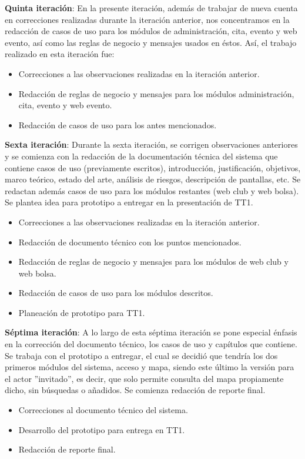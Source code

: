 \noindent
\textbf{Quinta iteración}: En la presente iteración, además de trabajar de nueva cuenta en correcciones realizadas durante la iteración anterior, nos concentramos en la redacción de casos de uso para los módulos de administración, cita, evento y web evento, así como las reglas de negocio y mensajes usados en éstos. Así, el trabajo realizado en esta iteración fue:
\begin{itemize}
	\item Correcciones a las observaciones realizadas en la iteración anterior. 
	\item Redacción de reglas de negocio y mensajes para los módulos administración, cita, evento y web evento.
	\item Redacción de casos de uso para los antes mencionados.
\end{itemize}

\noindent
\textbf{Sexta iteración}: Durante la sexta iteración, se corrigen observaciones anteriores y se comienza con la redacción de la documentación técnica del sistema que contiene casos de uso (previamente escritos), introducción, justificación, objetivos, marco teórico, estado del arte, análisis de riesgos, descripción de pantallas, etc. Se redactan además casos de uso para los módulos restantes (web club y web bolsa). Se plantea idea para prototipo a entregar en la presentación de TT1. 
\begin{itemize}
	\item Correcciones a las observaciones realizadas en la iteración anterior. 
	\item Redacción de documento técnico con los puntos mencionados.
	\item Redacción de reglas de negocio y mensajes para los módulos de web club y web bolsa.
	\item Redacción de casos de uso para los módulos descritos. 
	\item Planeación de prototipo para TT1. 
\end{itemize}

\noindent
\textbf{Séptima iteración}: A lo largo de esta séptima iteración se pone especial énfasis en la corrección del documento técnico, los casos de uso y capítulos que contiene. Se trabaja con el prototipo a entregar, el cual se decidió que tendría los dos primeros módulos del sistema, acceso y mapa, siendo este último la versión para el actor ''invitado'', es decir, que solo permite consulta del mapa propiamente dicho, sin búsquedas o añadidos. Se comienza redacción de reporte final. 
\begin{itemize}
	\item Correcciones al documento técnico del sistema.
	\item Desarrollo del prototipo para entrega en TT1.
	\item Redacción de reporte final. 
\end{itemize}

